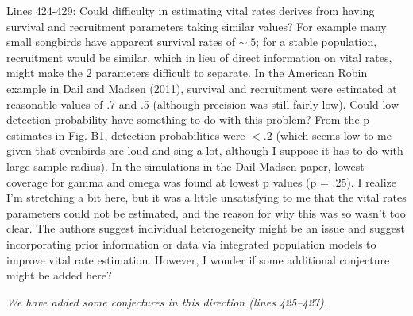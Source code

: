 \documentclass[12pt,english]{article}
\begin{document}
\begin{spacing}{1.9}
\begin{flushleft}
Lines 424-429: Could difficulty in estimating vital rates derives from having
survival and recruitment parameters taking similar values? For example many
small songbirds have apparent survival rates of $\sim .5$; for a stable population,
recruitment would be similar, which in lieu of direct information on vital
rates, might make the 2 parameters difficult to separate. In the American Robin
example in Dail and Madsen (2011), survival and recruitment were estimated at
reasonable values of .7 and .5 (although precision was still fairly low). Could
low detection probability have something to do with this problem? From the p
estimates in Fig. B1, detection probabilities were $< .2$ (which seems low to me
given that ovenbirds are loud and sing a lot, although I suppose it has to do
with large sample radius). In the simulations in the Dail-Madsen paper, lowest
coverage for gamma and omega was found at lowest p values (p = .25). I realize
I'm stretching a bit here, but it was a little
unsatisfying to me that the vital rates parameters could not be estimated, and
the reason for why this was so wasn't too clear. The authors suggest individual
heterogeneity might be an issue and suggest incorporating prior information or
data via integrated population models to improve vital rate estimation. However,
I wonder if some additional conjecture might be added here?

\vspace{0.5cm}
\textit{We have added some conjectures in this direction (lines 425--427).}
\vspace{0.5cm}




\end{flushleft}
\end{spacing}
\end{document}
